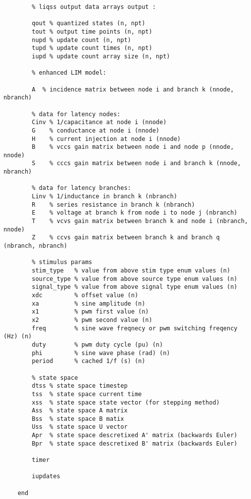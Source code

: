 \begin{lstlisting}
        % liqss output data arrays output :
        
        qout % quantized states (n, npt)
        tout % output time points (n, npt)
        nupd % update count (n, npt)
        tupd % update count times (n, npt)
        iupd % update count array size (n, npt)

        % enhanced LIM model:
        
        A  % incidence matrix between node i and branch k (nnode, nbranch)
        
        % data for latency nodes: 
        Cinv % 1/capacitance at node i (nnode)
        G    % conductance at node i (nnode)
        H    % current injection at node i (nnode)
        B    % vccs gain matrix between node i and node p (nnode, nnode)
        S    % cccs gain matrix between node i and branch k (nnode, nbranch)
        
        % data for latency branches:
        Linv % 1/inductance in branch k (nbranch)
        R    % series resistance in branch k (nbranch)
        E    % voltage at branch k from node i to node j (nbranch)
        T    % vcvs gain matrix between branch k and node i (nbranch, nnode)
        Z    % ccvs gain matrix between branch k and branch q (nbranch, nbranch)

        % stimulus params
        stim_type   % value from above stim type enum values (n)
        source_type % value from above source type enum values (n)
        signal_type % value from above signal type enum values (n)
        xdc         % offset value (n)
        xa          % sine amplitude (n)
        x1          % pwm first value (n)
        x2          % pwm second value (n)
        freq        % sine wave freqnecy or pwm switching freqency (Hz) (n)
        duty        % pwm duty cycle (pu) (n)
        phi         % sine wave phase (rad) (n)
        period      % cached 1/f (s) (n)
        
        % state space
        dtss % state space timestep
        tss  % state space current time
        xss  % state space state vector (for stepping method)
        Ass  % state space A matrix
        Bss  % state space B matix
        Uss  % state space U vector
        Apr  % state space descretixed A' matrix (backwards Euler)
        Bpr  % state space descretixed B' matrix (backwards Euler)
        
        timer
        
        iupdates

    end
    

\end{lstlisting}
